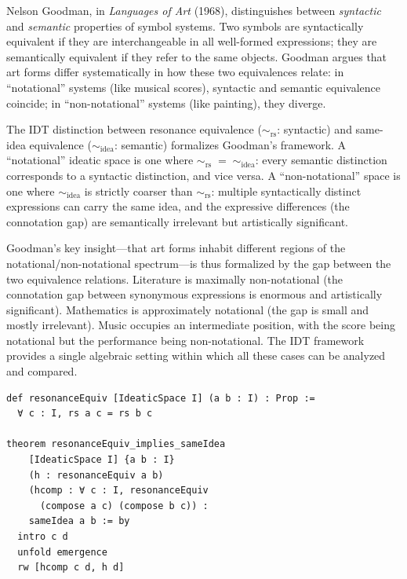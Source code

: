 \begin{interpretation}\label{interp:ch6:goodman_languages_art}
Nelson Goodman, in \emph{Languages of Art} (1968), distinguishes between
\emph{syntactic} and \emph{semantic} properties of symbol systems. Two
symbols are syntactically equivalent if they are interchangeable in all
well-formed expressions; they are semantically equivalent if they refer
to the same objects. Goodman argues that art forms differ systematically
in how these two equivalences relate: in ``notational'' systems (like
musical scores), syntactic and semantic equivalence coincide; in
``non-notational'' systems (like painting), they diverge.

The IDT distinction between resonance equivalence ($\sim_{\text{rs}}$:
syntactic) and same-idea equivalence ($\sim_{\text{idea}}$: semantic)
formalizes Goodman's framework. A ``notational'' ideatic space is one
where $\sim_{\text{rs}} \;= \;\sim_{\text{idea}}$: every semantic
distinction corresponds to a syntactic distinction, and vice versa. A
``non-notational'' space is one where $\sim_{\text{idea}}$ is strictly
coarser than $\sim_{\text{rs}}$: multiple syntactically distinct
expressions can carry the same idea, and the expressive differences
(the connotation gap) are semantically irrelevant but artistically
significant.

Goodman's key insight---that art forms inhabit different regions of the
notational/non-notational spectrum---is thus formalized by the gap
between the two equivalence relations. Literature is maximally
non-notational (the connotation gap between synonymous expressions is
enormous and artistically significant). Mathematics is approximately
notational (the gap is small and mostly irrelevant). Music occupies
an intermediate position, with the score being notational but the
performance being non-notational. The IDT framework provides a single
algebraic setting within which all these cases can be analyzed and
compared.
\end{interpretation}

\begin{lstlisting}[language=Lean4, caption={Resonance equivalence and its
relation to same-idea}]
def resonanceEquiv [IdeaticSpace I] (a b : I) : Prop :=
  ∀ c : I, rs a c = rs b c

theorem resonanceEquiv_implies_sameIdea
    [IdeaticSpace I] {a b : I}
    (h : resonanceEquiv a b)
    (hcomp : ∀ c : I, resonanceEquiv
      (compose a c) (compose b c)) :
    sameIdea a b := by
  intro c d
  unfold emergence
  rw [hcomp c d, h d]
\end{lstlisting}

